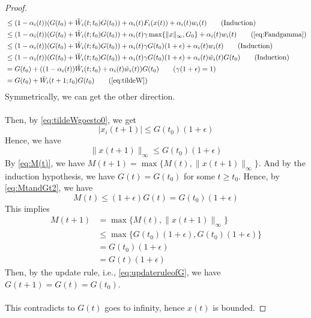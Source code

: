 \begin{proof}
\begin{align*}
    &\le (1-\alpha_i(t))(G(t_0) + \tilde W_i(t;t_0)G(t_0)) + \alpha_i(t)F_i(x(t)) + \alpha_i(t)w_i(t)\tag{Induction}\\
    &\le (1-\alpha_i(t))(G(t_0) + \tilde W_i(t;t_0)G(t_0)) + \alpha_i(t)\gamma\max\{\|x\|_\infty,G_0\} + \alpha_i(t)w_i(t)\tag{\autoref{eq:Fandgamma}}\\
    &\le (1-\alpha_i(t))(G(t_0) + \tilde W_i(t;t_0)G(t_0)) + \alpha_i(t)\gamma G(t_0)(1+\epsilon)+ \alpha_i(t)w_i(t)\tag{Induction}\\
    &\le (1-\alpha_i(t))(G(t_0) + \tilde W_i(t;t_0)G(t_0)) + \alpha_i(t)\gamma G(t_0)(1+\epsilon)+ \alpha_i(t)\tilde w_i(t)G(t_0)\tag{Induction}\\
    & = G(t_0) + ((1-\alpha_i(t))\tilde W_i(t;t_0)+\alpha_i(t)\tilde w_i(t))G(t_0)\tag{$\gamma(1+\epsilon)=1$}\\
    & = G(t_0)+ \tilde W_i(t+1;t_0)G(t_0) \tag{\autoref{eq:tildeW}}
\end{align*}
Symmetrically, we can get the other direction.\\
\\
Then, by \autoref{eq:tildeWgoesto0}, we get
$$
|x_i(t+1)|\le G(t_0)(1+\epsilon)
$$
Hence, we have
$$
\|x(t+1)\|_\infty \le G(t_0)(1+\epsilon)
$$
By \autoref{eq:M(t)}, we have $M(t+1) = \max\{M(t), \|x(t+1)\|_\infty\}$. And by the induction hypothesis, we have $G(t) = G(t_0)$ for some $t\ge t_0$. Hence, by \autoref{eq:MtandGt2}, we have
$$
M(t) \le (1+\epsilon)G(t) = G(t_0)(1+\epsilon)
$$
This implies
\begin{align*}
    M(t+1) &= \max\{M(t),\|x(t+1)\|_\infty\}\\
    &\le \max\{G(t_0)(1+\epsilon), G(t_0)(1+\epsilon)\}\\
    &= G(t_0)(1+\epsilon)\\
    & = G(t)(1+\epsilon)
\end{align*}
Then, by the update rule, i.e., \autoref{eq:updateruleofG}, we have $G(t+1) = G(t) = G(t_0)$.\\
\\
This contradicts to $G(t)$ goes to infinity, hence $x(t)$ is bounded.
\end{proof}
\newpage
